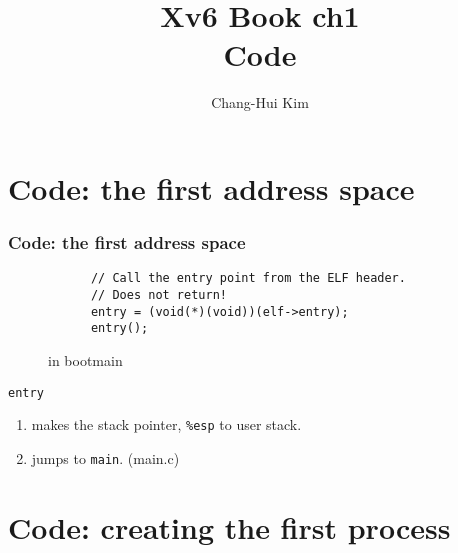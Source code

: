 \documentclass{beamer}
\title{Xv6 Book ch1\\ Code}
\author{Chang-Hui Kim}
\begin{document}
\begin{frame}
  \titlepage
\end{frame}


\section{Code: the first address space}


\begin{frame}[t, fragile]
  \frametitle{Code: the first address space}

  \begin{figure}
    \begin{lstlisting}
      // Call the entry point from the ELF header.
      // Does not return!
      entry = (void(*)(void))(elf->entry);
      entry();
    \end{lstlisting}
    \caption{in bootmain}
  \end{figure}

  \texttt{entry}
  \begin{enumerate}
  \item makes the stack pointer, \texttt{\%esp} to user stack.
  \item jumps to \texttt{main}. (main.c)
  \end{enumerate}
 
\end{frame}


\section{Code: creating the first process}

\end{document}
